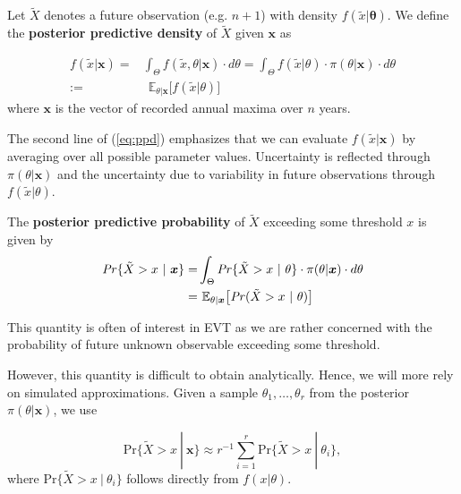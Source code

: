 \begin{definition}
	Let $\tilde{X}$ denotes a future observation (e.g. $n+1$) with density $f(\tilde{x}|\boldsymbol{\theta})$. We define the \textbf{posterior predictive density} of $\tilde{X}$ given $\boldsymbol{x}$ as 
	
	\begin{equation}\label{eq:ppd}
	\begin{aligned}
	f(\tilde{x}|\boldsymbol{x})
	= & \int_{\Theta}f(\tilde{x},\theta | \boldsymbol{x})\cdot d\theta=\int_{\Theta} f(\tilde{x}|\theta)\cdot \pi (\theta|\boldsymbol{x})\cdot d\theta
	\\ := & \ \ \mathbb{E}_{\theta|\boldsymbol{x}}\big[f(\tilde{x}|\theta)\big]
	\end{aligned}
	\end{equation}
	where $\boldsymbol{x}$ is the vector of recorded annual maxima over $n$ years.	
\end{definition}
The second line of (\ref{eq:ppd}) emphasizes that we can evaluate $f(\tilde{x}|\boldsymbol{x})$ by averaging over all possible parameter values.
Uncertainty is reflected through $\pi(\theta|\boldsymbol{x})$ and the uncertainty due to variability in future observations through $f(\tilde{x}|\theta)$.

\begin{definition}
	The \textbf{posterior predictive probability} of $\tilde{X}$ exceeding some threshold $x$ is given by
	\begin{equation}
	\begin{aligned}
	\text{\emph{Pr}}\{\tilde{X}>x\ | \ \boldsymbol{x}\}= &\int_{\Theta}\text{\emph{Pr}}\{\tilde{X}>x \ | \ \theta \} \cdot \pi(\theta|\boldsymbol{x})\cdot d\theta \\ 
	= & \ \mathbb{E}_{\theta|\boldsymbol{x}}\big[\text{\emph{Pr}}(\tilde{X}>x \ | \ \theta)\big]
	\end{aligned}
	\end{equation}
\end{definition}
This quantity is often of interest in EVT as we are rather concerned with the probability of future unknown observable exceeding some threshold.

However, this quantity is difficult to obtain analytically. Hence, we will more rely on simulated approximations. Given a sample $\theta_1,\dots,\theta_r$ from the posterior $\pi(\theta|\boldsymbol{x})$, we use 

\begin{equation}
\text{Pr}\{\tilde{X}>x\ | \ \boldsymbol{x}\}\approx r^{-1}\sum_{i=1}^r\text{Pr}\{\tilde{X}>x \ | \ \theta_i\},
\end{equation}
where $\text{Pr}\{\tilde{X}>x \ | \ \theta_i\}$ follows directly from $f(x|\theta)$. 

